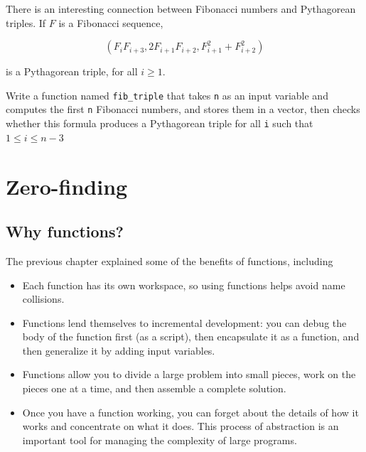 \documentclass[
]{book}
\numberwithin{Answer}{chapter}
\numberwithin{Exercise}{chapter}
\begin{document}
\begin{ex}

There is an interesting connection between Fibonacci numbers and
Pythagorean triples.  If $F$ is a Fibonacci sequence,

\begin{equation}
(F_i F_{i+3}, 2 F_{i+1} F_{i+2}, F_{i+1}^2 + F_{i+2}^2 )
\end{equation}

is a Pythagorean triple, for all $i \ge 1$.

Write a function named {\tt fib\_triple} that
takes {\tt n} as an input variable and computes 
the first {\tt n} Fibonacci numbers, and stores them in a vector,
then checks whether this formula produces a Pythagorean triple for all {\tt i} such that $ 1 \leq i \leq n-3 $

\end{ex}



\chapter{Zero-finding}


\section{Why functions?}

The previous chapter explained some of the benefits of functions,
including

\begin{itemize}

\item Each function has its own workspace, so using functions helps
avoid name collisions.

\item Functions lend themselves to incremental development: you can
debug the body of the function first (as a script), then encapsulate
it as a function, and then generalize it by adding input variables.

\item Functions allow you to divide a large problem into small
pieces, work on the pieces one at a time, and then assemble a
complete solution.

\item Once you have a function working, you can forget about the
details of how it works and concentrate on what it does.  This
process of abstraction is an important tool for managing the
complexity of large programs.

\end{itemize}
\end{document}
